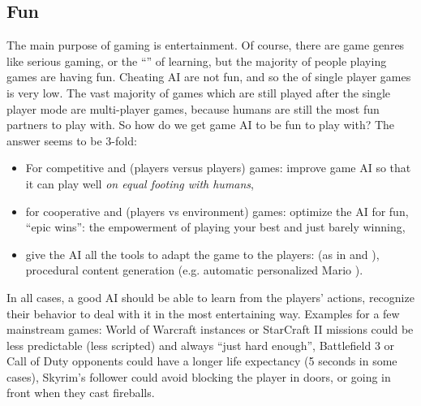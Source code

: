 \subsection{Fun}
The main purpose of gaming is entertainment. Of course, there are game genres like serious gaming, or the ``'' of learning, but the majority of people playing games are having fun. Cheating AI are not fun, and so the  of single player games is very low. The vast majority of games which are still played after the single player mode are multi-player games, because humans are still the most fun partners to play with. So how do we get game AI to be fun to play with? The answer seems to be 3-fold:
\begin{itemize}
\item For competitive and 
(players versus players) games: improve game AI so that it can play well \textit{on equal footing with humans},
\item for cooperative and 
(players vs environment) games: optimize the AI for fun, ``epic wins'': the empowerment of playing your best and just barely winning,
\item give the AI all the tools to adapt the game to the players:  (as in  and ), procedural content generation (e.g. automatic personalized Mario \citep{Shaker10AIIDE}).
\end{itemize}
In all cases, a good AI should be able to learn from the players' actions, recognize their behavior to deal with it in the most entertaining way. Examples for a few mainstream games: World of Warcraft instances or StarCraft II missions could be less predictable (less scripted) and always ``just hard enough'', Battlefield 3 or Call of Duty opponents could have a longer life expectancy (5 seconds in some cases), Skyrim's follower  could avoid blocking the player in doors, or going in front when they cast fireballs.

